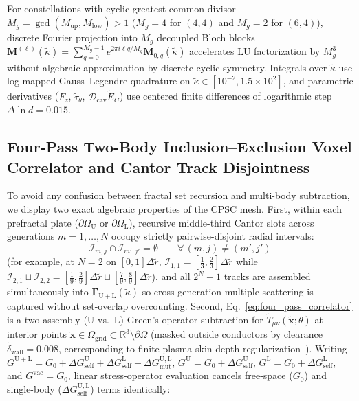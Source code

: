 \documentclass[aps,prd,twocolumn,10pt,showkeys,nofootinbib,floatfix,longbibliography]{revtex4-2}
\begin{document}
For constellations with cyclic greatest common divisor $M_g = \gcd(M_{\mathrm{up}}, M_{\mathrm{low}}) > 1$ ($M_g = 4$ for $(4,4)$ and $M_g = 2$ for $(6,4)$), discrete Fourier projection into $M_g$ decoupled Bloch blocks $\mathbf{M}^{(\ell)}(\tilde{\kappa}) = \sum_{q=0}^{M_g-1} e^{2\pi i \ell q / M_g} \mathbf{M}_{0,q}(\tilde{\kappa})$ accelerates LU factorization by $M_g^3$ without algebraic approximation by discrete cyclic symmetry. Integrals over $\tilde{\kappa}$ use log-mapped Gauss--Legendre quadrature on $\tilde{\kappa} \in [10^{-2}, 1.5\times 10^2]$, and parametric derivatives ($\tilde{F}_z$, $\tilde{\tau}_\theta$, $\mathcal{D}_{\mathrm{cav}}\tilde{E}_C$) use centered finite differences of logarithmic step $\Delta\ln d = 0.015$.

\subsection{Four-Pass Two-Body Inclusion--Exclusion Voxel Correlator and Cantor Track Disjointness}
\label{subsec:methods_voxel}
To avoid any confusion between fractal set recursion and multi-body subtraction, we display two exact algebraic properties of the CPSC mesh. First, within each prefractal plate ($\partial\Omega_{\mathrm{U}}$ or $\partial\Omega_{\mathrm{L}}$), recursive middle-third Cantor slots across generations $m = 1,\dots,N$ occupy strictly pairwise-disjoint radial intervals:
\[
\mathcal{I}_{m,j} \cap \mathcal{I}_{m',j'} = \emptyset \qquad \forall\,(m,j) \neq (m',j')
\]
(for example, at $N=2$ on $[0,1]\Delta\tilde{r}$, $\mathcal{I}_{1,1} = [\frac{1}{3},\frac{2}{3}]\Delta\tilde{r}$ while $\mathcal{I}_{2,1} \sqcup \mathcal{I}_{2,2} = [\frac{1}{9},\frac{2}{9}]\Delta\tilde{r} \sqcup [\frac{7}{9},\frac{8}{9}]\Delta\tilde{r}$), and all $2^N - 1$ tracks are assembled simultaneously into $\mathbf{\Gamma}_{\mathrm{U+L}}(\tilde{\kappa})$ so cross-generation multiple scattering is captured without set-overlap overcounting. Second, Eq.~\eqref{eq:four_pass_correlator} is a two-assembly ($\mathrm{U}$ vs.\ $\mathrm{L}$) Green's-operator subtraction for $\tilde{T}_{\mu\nu}(\tilde{\mathbf{x}}; \theta)$ at interior points $\tilde{\mathbf{x}} \in \Omega_{\mathrm{grid}} \subset \mathbb{R}^3 \setminus \partial\Omega$ (masked outside conductors by clearance $\tilde{\delta}_{\mathrm{wall}} = 0.008$, corresponding to finite plasma skin-depth regularization~\cite{deutsch1979,graham2003}). Writing $G^{\mathrm{U+L}} = G_0 + \Delta G_{\mathrm{self}}^{\mathrm{U}} + \Delta G_{\mathrm{self}}^{\mathrm{L}} + \Delta G_{\mathrm{mut}}^{\mathrm{U,L}}$, $G^{\mathrm{U}} = G_0 + \Delta G_{\mathrm{self}}^{\mathrm{U}}$, $G^{\mathrm{L}} = G_0 + \Delta G_{\mathrm{self}}^{\mathrm{L}}$, and $G^{\mathrm{vac}} = G_0$, linear stress-operator evaluation cancels free-space ($G_0$) and single-body ($\Delta G_{\mathrm{self}}^{\mathrm{U,L}}$) terms identically:
\end{document}
